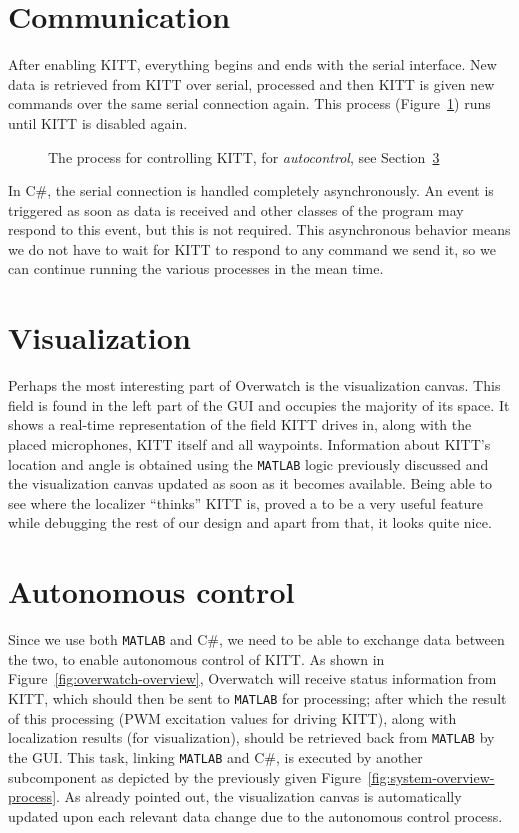 \documentclass[11pt,titlepage]{report}
\begin{document}
\section{Communication}
After enabling KITT, everything begins and ends with the serial interface. New data is retrieved from KITT over serial, processed and then KITT is given new commands over the same serial connection again. This process (Figure~\ref{fig:overwatch-process}) runs until KITT is disabled again.

\begin{figure}[H]
	\centering
	
	\caption{The process for controlling KITT, for \emph{autocontrol}, see Section~\ref{sec:gui-autocontrol}}
	\label{fig:overwatch-process}
\end{figure}

In C\#, the serial connection is handled completely asynchronously. An event is triggered as soon as data is received and other classes of the program may respond to this event, but this is not required. This asynchronous behavior means we do not have to wait for KITT to respond to any command we send it, so we can continue running the various processes in the mean time.

\section{Visualization}
Perhaps the most interesting part of Overwatch is the visualization canvas. This field is found in the left part of the GUI and occupies the majority of its space. It shows a real-time representation of the field KITT drives in, along with the placed microphones, KITT itself and all waypoints. Information about KITT's location and angle is obtained using the \texttt{MATLAB} logic previously discussed and the visualization canvas updated as soon as it becomes available. Being able to see where the localizer ``thinks'' KITT is, proved a to be a very useful feature while debugging the rest of our design and apart from that, it looks quite nice.

\section{Autonomous control}
\label{sec:gui-autocontrol}
Since we use both \texttt{MATLAB} and C\#, we need to be able to exchange data between the two, to enable autonomous control of KITT. As shown in Figure~\ref{fig:overwatch-overview}, Overwatch will receive status information from KITT, which should then be sent to \texttt{MATLAB} for processing; after which the result of this processing (PWM excitation values for driving KITT), along with localization results (for visualization), should be retrieved back from \texttt{MATLAB} by the GUI. This task, linking \texttt{MATLAB} and C\#, is executed by another subcomponent as depicted by the previously given Figure~\ref{fig:system-overview-process}. As already pointed out, the visualization canvas is automatically updated upon each relevant data change due to the autonomous control process.
\end{document}
